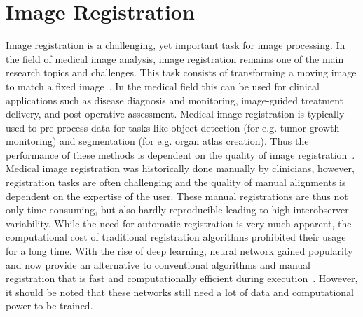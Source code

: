 \documentclass[english,version-2022-01]{uzl-thesis} %
\begin{document}
\section{Image Registration} \label{Sec:ImageRegistration}
Image registration is a challenging, yet important task for image processing. In the field of medical image analysis, image registration remains one of the main research topics and challenges. This task consists of transforming a moving image to match a fixed image~\cite{NiftiReg}. 
In the medical field this can be used for clinical applications such as disease diagnosis and monitoring, image-guided treatment delivery, and post-operative assessment. Medical image registration is typically used to pre-process data for tasks like object detection (for e.g. tumor growth monitoring) and segmentation (for e.g. organ atlas creation).
Thus the performance of these methods is dependent on the quality of image registration~\cite{Chen2020}. \\
Medical image registration was historically done manually by clinicians, however, registration tasks are often challenging and the quality of manual alignments is dependent on the expertise of the user. These manual registrations are thus not only time consuming, but also hardly reproducible leading to high interobserver-variability. While the need for automatic registration is very much apparent, the computational cost of traditional registration algorithms prohibited their usage for a long time. 
With the rise of deep learning, neural network gained popularity and now provide an alternative to conventional algorithms and manual registration that is fast and computationally efficient during execution~\cite{Haskins2020}. However, it should be noted that these networks still need a lot of data and computational power to be trained.\\
\end{document}
